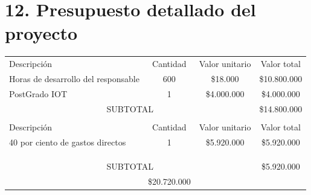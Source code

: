 \documentclass[
11pt, %
]{charter}
\begin{document}
\section{12. Presupuesto detallado del proyecto}
\label{sec:presupuesto}

\begin{table}[htpb]
\centering
\begin{tabularx}{\linewidth}{@{}|X|c|r|r|@{}}
\hline
\rowcolor[HTML]{C0C0C0} 
\multicolumn{4}{|c|}{\cellcolor[HTML]{C0C0C0}COSTOS DIRECTOS} \\ \hline
\rowcolor[HTML]{C0C0C0} 
Descripción &
  \multicolumn{1}{c|}{\cellcolor[HTML]{C0C0C0}Cantidad} &
  \multicolumn{1}{c|}{\cellcolor[HTML]{C0C0C0}Valor unitario} &
  \multicolumn{1}{c|}{\cellcolor[HTML]{C0C0C0}Valor total} \\ \hline

 Horas de desarrollo del responsable &
  \multicolumn{1}{c|}{600} &
  \multicolumn{1}{c|}{\$18.000 } &
  \multicolumn{1}{c|}{\$10.800.000} \\ \hline
 PostGrado IOT&
  \multicolumn{1}{c|}{1} &
  \multicolumn{1}{c|}{\$4.000.000} &
  \multicolumn{1}{c|}{\$4.000.000} \\ \hline
\multicolumn{3}{|c|}{SUBTOTAL} &
  \multicolumn{1}{c|}{\$14.800.000} \\ \hline
\rowcolor[HTML]{C0C0C0} 
\multicolumn{4}{|c|}{\cellcolor[HTML]{C0C0C0}COSTOS INDIRECTOS} \\ \hline
\rowcolor[HTML]{C0C0C0} 
Descripción &
  \multicolumn{1}{c|}{\cellcolor[HTML]{C0C0C0}Cantidad} &
  \multicolumn{1}{c|}{\cellcolor[HTML]{C0C0C0}Valor unitario} &
  \multicolumn{1}{c|}{\cellcolor[HTML]{C0C0C0}Valor total} \\ \hline

 40 por ciento de gastos directos &
  \multicolumn{1}{c|}{1} &
  \multicolumn{1}{c|}{\$5.920.000 } &
  \multicolumn{1}{c|}{\$5.920.000} \\ \hline


\multicolumn{1}{|l|}{} &
   &
   &
   \\ \hline
\multicolumn{1}{|l|}{} &
   &
   &
   \\ \hline
\multicolumn{1}{|l|}{} &
   &
   &
   \\ \hline
\multicolumn{3}{|c|}{SUBTOTAL} &
  \multicolumn{1}{c|}{\$5.920.000} \\ \hline
\rowcolor[HTML]{C0C0C0}
\multicolumn{3}{|c|}{TOTAL} & \$20.720.000
   \\ \hline
\end{tabularx}%
\end{table}
\end{document}
